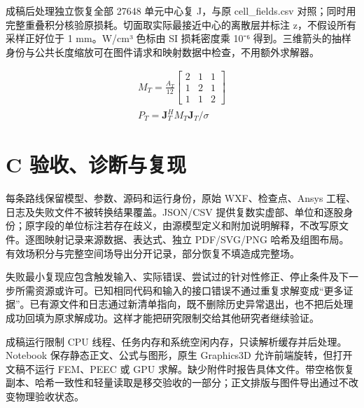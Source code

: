 \documentclass[11pt]{article}
\begin{document}
成稿后处理独立恢复全部 27648 单元中心复 J，与原 cell\_fields.csv 对照；同时用完整重叠积分核验原损耗。切面取实际最接近中心的离散层并标注 z，不假设所有采样正好位于 1 mm。W/cm³ 色标由 SI 损耗密度乘 10⁻⁶ 得到。三维箭头的抽样身份与公共长度缩放可在图件请求和映射数据中检查，不用额外求解器。


\hypertarget{E09}{}
\begin{equation}
\begin{gathered}
M_T=\frac{A_T}{12}\begin{bmatrix}2&1&1\\1&2&1\\1&1&2\end{bmatrix} \\
P_T=\mathbf J_T^H M_T\mathbf J_T/\sigma
\end{gathered}
\tag{9}\label{eq:E09}
\end{equation}
\FloatBarrier
\section*{C 验收、诊断与复现}
\hypertarget{chapter-C}{}
每条路线保留模型、参数、源码和运行身份，原始 WXF、检查点、Ansys 工程、日志及失败文件不被转换结果覆盖。JSON/CSV 提供复数实虚部、单位和逐股身份；原字段的单位标注若存在歧义，由源模型定义和附加说明解释，不改写原文件。逐图映射记录来源数据、表达式、独立 PDF/SVG/PNG 哈希及组图布局。有效场积分与完整空间场导出分开记录，部分恢复不填造成完整场。


失败最小复现应包含触发输入、实际错误、尝试过的针对性修正、停止条件及下一步所需资源或许可。已知相同代码和输入的接口错误不通过重复求解变成“更多证据”。已有源文件和日志通过新清单指向，既不删除历史异常退出，也不把后处理成功回填为原求解成功。这样才能把研究限制交给其他研究者继续验证。


成稿运行限制 CPU 线程、任务内存和系统空闲内存，只读解析缓存并后处理。Notebook 保存静态正文、公式与图形，原生 Graphics3D 允许前端旋转，但打开文稿不运行 FEM、PEEC 或 GPU 求解。缺少附件时报告具体文件。带空格恢复副本、哈希一致性和轻量读取是移交验收的一部分；正文排版与图件导出通过不改变物理验收状态。
\end{document}
